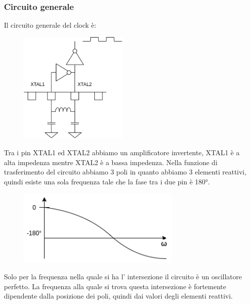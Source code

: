 \subsubsection{Circuito generale}
Il circuito generale del clock è:
\begin{figure}[H]
    \centering
    \includegraphics[width=200px]{images/17_Clock/basic_clock_generator.png}
\end{figure}
Tra i pin XTAL1 ed XTAL2 abbiamo un amplificatore invertente, XTAL1 è a alta impedenza mentre XTAL2 è a bassa impedenza.
Nella funzione di trasferimento del circuito abbiamo 3 poli in quanto abbiamo 3 elementi reattivi, quindi esiste una sola frequenza tale che la fase tra i due pin è 180°.
\begin{figure}[H]
    \centering
    \includegraphics[width=300px]{images/17_Clock/frequency_response.png}
\end{figure}
Solo per la frequenza nella quale si ha l' intersezione il circuito è un oscillatore perfetto.
La frequenza alla quale si trova questa intersezione è fortemente dipendente dalla posizione dei poli, quindi dai valori degli elementi reattivi.

